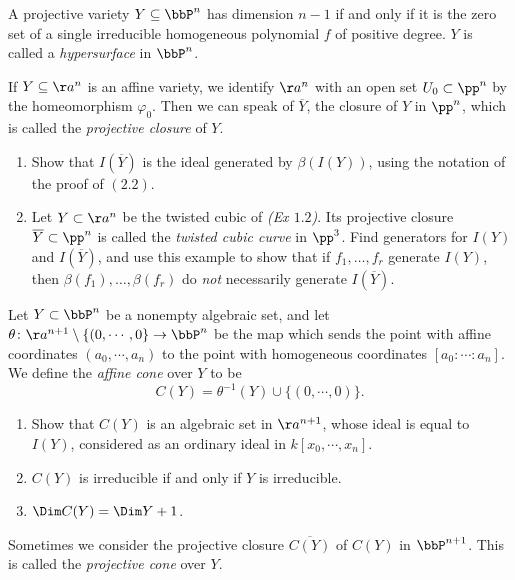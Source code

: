 \begin{exercise}[2.8]
    A projective variety $Y \subseteq \bbP^n$ has dimension $n-1$ if
    and only if it is the zero set of a single irreducible homogeneous polynomial
    $f$ of positive degree. $Y$ is called a \emph{hypersurface} in $\bbP^n$.   
\end{exercise}

\begin{exercise}[2.9]
    If $Y \subseteq \aa^n$ is an affine variety, we identify $\aa^n$ with an open
    set $U_0 \subset \pp^n$ by the homeomorphism $\varphi_0$. Then we can speak of
    $\overline{Y}$, the closure of $Y$ in $\pp^n$, which is called the
    \emph{projective closure} of $Y$. 
   \begin{enumerate}
     \item Show that $I(\overline{Y})$ is the ideal generated by $\beta(I(Y))$,
       using the notation of the proof of $(2.2)$. 
     \item Let $Y \subset \aa^n$ be the twisted cubic of \emph{(Ex $1.2$)}. Its
       projective closure $\overline{Y} \subset \pp^n$ is called the \emph{twisted
       cubic curve} in $\pp^3$. Find generators for $I(Y)$ and $I(\overline{Y})$,
       and use this example to show that if $f_1, \ldots, f_r$ generate $I(Y)$,
       then $\beta(f_1), \ldots, \beta(f_r)$ do \emph{not} necessarily generate
       $I(\overline{Y})$. 
   \end{enumerate}
\end{exercise}

\begin{exercise}[2.10]
    Let $Y \subset \bbP^n$ be a nonempty algebraic set, and let $\theta\colon
    \aa^{n+1} \setminus \{(0,\cdots,0\} \to \bbP^n$ be the map which sends the
    point with affine coordinates $(a_0, \cdots, a_n)$ to the point with
    homogeneous coordinates $[a_0 :\cdots: a_n]$. We define the \emph{affine cone}
    over $Y$ to be $$C(Y) = \theta^{-1}(Y) \cup \{(0,\cdots, 0)\}.$$ 
    \begin{enumerate}
        \item Show that $C(Y)$ is an algebraic set in $\aa^{n+1}$, whose ideal is equal to $I(Y)$, considered as an ordinary ideal in $k[x_0, \cdots, x_n]$. 
        \item $C(Y)$ is irreducible if and only if $Y$ is irreducible. 
        \item $\Dim C(Y) = \Dim Y +1$.
    \end{enumerate}
    Sometimes we consider the projective closure $\overline{C(Y)}$ of $C(Y)$ in
    $\bbP^{n+1}$. This is called the \emph{projective cone} over $Y$.
\end{exercise}

